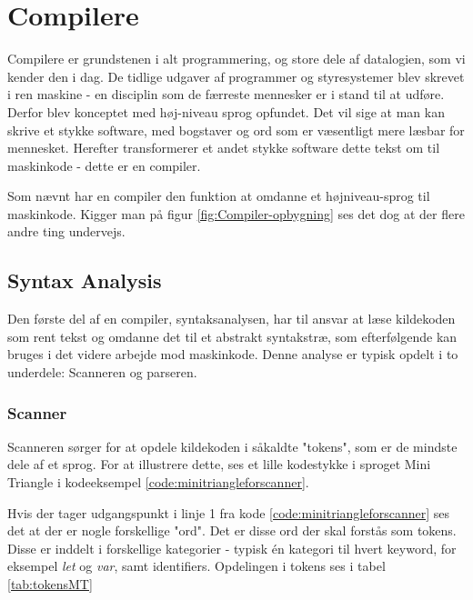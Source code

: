 \section{Compilere}
Compilere er grundstenen i alt programmering, og store dele af datalogien, som vi kender den i dag. De tidlige udgaver af programmer og styresystemer blev skrevet i ren maskine - en disciplin som de færreste mennesker er i stand til at udføre. Derfor blev konceptet med høj-niveau sprog opfundet. Det vil sige at man kan skrive et stykke software, med bogstaver og ord som er væsentligt mere læsbar for mennesket. Herefter transformerer et andet stykke software dette tekst om til maskinkode - dette er en compiler.





\noindent Som nævnt har en compiler den funktion at omdanne et højniveau-sprog til maskinkode. Kigger man på figur \ref{fig:Compiler-opbygning} ses det dog at der flere andre ting undervejs.

\subsection{Syntax Analysis}
Den første del af en compiler, syntaksanalysen, har til ansvar at læse kildekoden som rent tekst og omdanne det til et abstrakt syntakstræ, som efterfølgende kan bruges i det videre arbejde mod maskinkode. Denne analyse er typisk opdelt i to underdele: Scanneren og parseren. 

\subsubsection{Scanner}
Scanneren sørger for at opdele kildekoden i såkaldte "tokens"\mbox{}, som er de mindste dele af et sprog. For at illustrere dette, ses et lille kodestykke i sproget Mini Triangle i kodeeksempel \ref{code:minitriangleforscanner}.


\noindent Hvis der tager udgangspunkt i linje 1 fra kode \ref{code:minitriangleforscanner} ses det at der er nogle forskellige "ord"\mbox{}. Det er disse ord der skal forstås som tokens. Disse er inddelt i forskellige kategorier - typisk én kategori til hvert keyword, for eksempel \textit{let} og \textit{var}, samt identifiers. Opdelingen i tokens ses i tabel \ref{tab:tokensMT}

